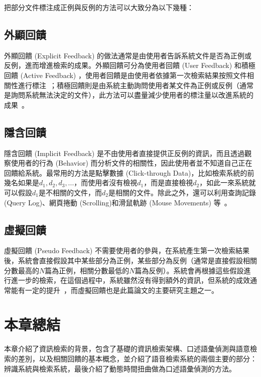 把部分文件標注成正例與反例的方法可以大致分為以下幾種：

\subsection{外顯回饋}
外顯回饋 (Explicit Feedback) 的做法通常是由使用者告訴系統文件是否為正例或反例，進而增進檢索的成果。外顯回饋可分為使用者回饋 (User Feedback) 和積極回饋 (Active Feedback)
，使用者回饋是由使用者依據第一次檢索結果按照文件相關性進行標注~\cite{salton1975vector, zhai2001model, robertson1976relevance}；積極回饋則是由系統主動詢問使用者某文件為正例或反例（通常是詢問系統無法決定的文件），此方法可以盡量減少使用者的標注量以改進系統的成果~\cite{tong2001support, goh2004multimodal, he2004mean}。

\subsection{隱含回饋}
隱含回饋 (Implicit Feedback) 是不由使用者直接提供正反例的資訊，而且透過觀察使用者的行為 (Behavior) 而分析文件的相關性，因此使用者並不知道自己正在回饋給系統。最常用的方法是點擊數據 (Click-through Data)，比如檢索系統的前幾名如果是$d_1, d_2, d_3, ...$，而使用者沒有檢視$d_1$，而是直接檢視$d_2$，如此一來系統就可以假設$d_1$是不相關的文件，而$d_2$是相關的文件。除此之外，還可以利用查詢記錄 (Query Log)、網頁捲動
(Scrolling)和滑鼠軌跡 (Mouse Movements) 等~\cite{kelly2003implicit}。

\subsection{虛擬回饋}
虛擬回饋 (Pseudo Feedback) 不需要使用者的參與，在系統產生第一次檢索結果後，系統會直接假設其中某些部分為正例，某些部分為反例（通常是直接假設相關分數最高的$N$篇為正例，相關分數最低的$N$篇為反例）。系統會再根據這些假設進行進一步的檢索，在這個過程中，系統雖然沒有得到額外的資訊，但系統的成效通常能有一定的提升~\cite{kurland2005better, xu1996query, yu2003improving, sakai2005flexible, cao2008selecting, lee2008cluster, lv2009comparative, lv2010positional}，而虛擬回饋也是此篇論文的主要研究主題之一。

\section{本章總結}
本章介紹了資訊檢索的背景，包含了基礎的資訊檢索架構、口述語彙偵測與語意檢索的差別，以及相關回饋的基本概念，並介紹了語音檢索系統的兩個主要的部分：辨識系統與檢索系統，最後介紹了動態時間扭曲做為口述語彙偵測的方法。
